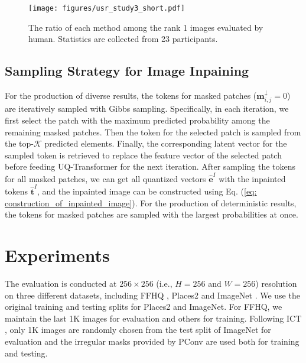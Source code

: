 \documentclass[10pt,twocolumn,letterpaper]{article}
\begin{document}
\begin{figure}[t]
	\centering
	\texttt{[image: figures/usr\_study3\_short.pdf]} 
    \vspace{-10pt}
\caption{The ratio of each method among the rank 1 images evaluated by human. Statistics are collected from 23 participants.}
    \vspace{-10pt}
	\label{figure: usr_study}
\end{figure}


\subsection{Sampling Strategy for Image Inpaining}
\label{sec: sampling_strategy}
For the production of diverse results, the tokens for masked patches ($\mathbf{m}_{i,j}^{\downarrow}=0$) are iteratively sampled with Gibbs sampling. Specifically, in each iteration, we first select the patch with the maximum predicted probability among the remaining masked patches. Then the token for the selected patch is sampled from the top-$\mathcal{K}$ predicted elements. Finally, the corresponding latent vector for the sampled token is retrieved to replace the feature vector of the selected patch before feeding UQ-Transformer for the next iteration. After sampling the tokens for all masked patches, we can get all quantized vectors $\mathbf{\hat{e}}^I$ with the inpainted tokens $\mathbf{\hat{t}}^I$, and the inpainted image can be constructed using Eq. (\ref{eq: construction_of_inpainted_image}). 
For the production of deterministic results, the tokens for masked patches are sampled with the largest probabilities at once.


\section{Experiments}
\label{sec: experiments}
The evaluation is conducted at $256 \times 256$ (i.e., $H=256$ and $W=256$) resolution on three different datasets, including FFHQ \cite{karras2019style}, Places2 \cite{zhou2017places} and ImageNet \cite{deng2009imagenet}. We use the original training and testing splits for Places2 and ImageNet. For FFHQ, we maintain the last 1K images for evaluation and others for training. Following ICT \cite{wan2021high}, only 1K images are randomly chosen from the test split of ImageNet for evaluation and the irregular masks provided by PConv \cite{liu2018image} are used both for training and testing.
\end{document}
